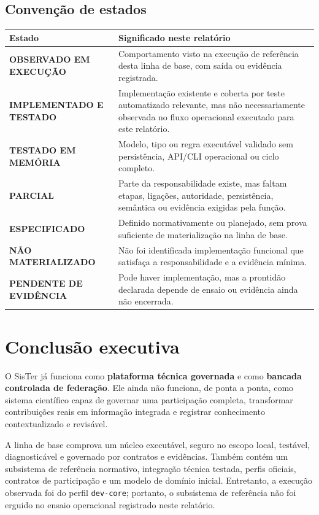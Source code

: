 \documentclass[11pt,a4paper,oneside]{article}
\newcommand{\statusobservado}{\textcolor{sistergreen}{\textbf{OBSERVADO EM EXECUÇÃO}}}
\newcommand{\statustestado}{\textcolor{sisterblue}{\textbf{IMPLEMENTADO E TESTADO}}}
\newcommand{\statusmemoria}{\textcolor{sisterpurple}{\textbf{TESTADO EM MEMÓRIA}}}
\newcommand{\statusparcial}{\textcolor{sisteramber}{\textbf{PARCIAL}}}
\newcommand{\statusespec}{\textcolor{sisterdarkgray}{\textbf{ESPECIFICADO}}}
\newcommand{\statusausente}{\textcolor{sisterred}{\textbf{NÃO MATERIALIZADO}}}
\newcommand{\statuspendente}{\textcolor{sisteramber}{\textbf{PENDENTE DE EVIDÊNCIA}}}
\begin{document}
\subsection*{Convenção de estados}
\begin{tabularx}{\textwidth}{P{4.1cm}Y}
\toprule
\textbf{Estado} & \textbf{Significado neste relatório} \\
\midrule
\statusobservado & Comportamento visto na execução de referência desta linha de base, com saída ou evidência registrada. \\
\statustestado & Implementação existente e coberta por teste automatizado relevante, mas não necessariamente observada no fluxo operacional executado para este relatório. \\
\statusmemoria & Modelo, tipo ou regra executável validado sem persistência, API/CLI operacional ou ciclo completo. \\
\statusparcial & Parte da responsabilidade existe, mas faltam etapas, ligações, autoridade, persistência, semântica ou evidência exigidas pela função. \\
\statusespec & Definido normativamente ou planejado, sem prova suficiente de materialização na linha de base. \\
\statusausente & Não foi identificada implementação funcional que satisfaça a responsabilidade e a evidência mínima. \\
\statuspendente & Pode haver implementação, mas a prontidão declarada depende de ensaio ou evidência ainda não encerrada. \\
\bottomrule
\end{tabularx}

\tableofcontents
\clearpage
{}

\section{Conclusão executiva}

\begin{conclusao}
O SisTer já funciona como \textbf{plataforma técnica governada} e como \textbf{bancada controlada de federação}. Ele ainda não funciona, de ponta a ponta, como sistema científico capaz de governar uma participação completa, transformar contribuições reais em informação integrada e registrar conhecimento contextualizado e revisável.
\end{conclusao}

A linha de base comprova um núcleo executável, seguro no escopo local, testável, diagnosticável e governado por contratos e evidências. Também contém um subsistema de referência normativo, integração técnica testada, perfis oficiais, contratos de participação e um modelo de domínio inicial. Entretanto, a execução observada foi do perfil \texttt{dev-core}; portanto, o subsistema de referência não foi erguido no ensaio operacional registrado neste relatório.
\end{document}
